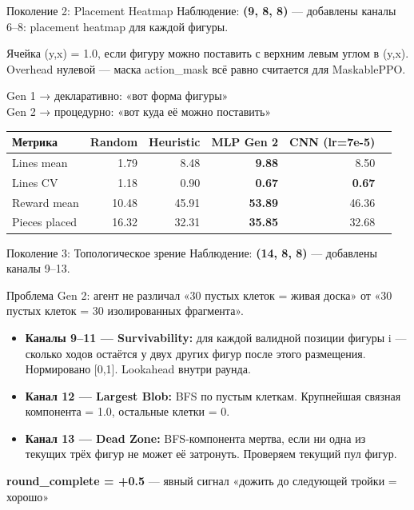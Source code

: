 \documentclass[aspectratio=169]{beamer}
\begin{document}
	
	\begin{frame}{Поколение 2: Placement Heatmap}
		Наблюдение: \textbf{(9, 8, 8)} — добавлены каналы 6–8: placement heatmap для каждой фигуры.
		
		\bigskip
		Ячейка (y,x) = 1.0, если фигуру можно поставить с верхним левым углом в (y,x).
		Overhead нулевой — маска action\_mask всё равно считается для MaskablePPO.
		
		\bigskip
		Gen 1 → декларативно: «вот форма фигуры» \\
		Gen 2 → процедурно: «вот куда её можно поставить»
		
		\bigskip
		\begin{tabular}{@{}lrrrrr@{}}
			\toprule
			\rowcolor{ThemeGridStroke}
			\color{ThemeCellFilled}Метрика & \color{ThemeCellFilled}Random & \color{ThemeCellFilled}Heuristic & \color{ThemeCellFilled}MLP Gen 2 & \color{ThemeCellFilled}CNN (lr=7e-5) \\
			\midrule
			Lines mean   & 1.79   & 8.48      & \textbf{9.88}   & 8.50 \\
			Lines CV     & 1.18   & 0.90      & \textbf{0.67}            & \textbf{0.67} \\
			Reward mean  & 10.48  & 45.91     & \textbf{53.89}  & 46.36 \\
			Pieces placed & 16.32 & 32.31     & \textbf{35.85}  & 32.68 \\
			\bottomrule
		\end{tabular}
	\end{frame}
	
	\begin{frame}{Поколение 3: Топологическое зрение}
		Наблюдение: \textbf{(14, 8, 8)} — добавлены каналы 9–13.
		
		\bigskip
		Проблема Gen 2: агент не различал «30 пустых клеток = живая доска» от
		«30 пустых клеток = 30 изолированных фрагмента».
		
		\bigskip
		\begin{itemize}
			\item \textbf{Каналы 9–11 — Survivability:}
			для каждой валидной позиции фигуры i — сколько ходов остаётся у двух других фигур после этого размещения.
			Нормировано [0,1]. Lookahead внутри раунда.
			
			\item \textbf{Канал 12 — Largest Blob:}
			BFS по пустым клеткам. Крупнейшая связная компонента = 1.0, остальные клетки = 0.
			
			\item \textbf{Канал 13 — Dead Zone:}
			BFS-компонента мертва, если ни одна из текущих трёх фигур не может её затронуть.
			Проверяем текущий пул фигур.
		\end{itemize}
		
		\bigskip
		\textbf{round\_complete = +0.5} — явный сигнал «дожить до следующей тройки = хорошо»
	\end{frame}
	
\end{document}

